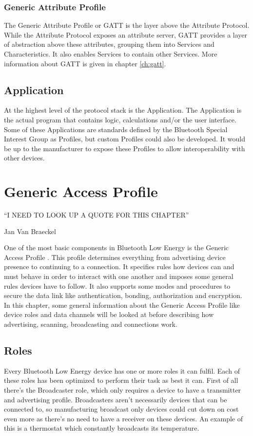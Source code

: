 \documentclass[pdftex,a4paper,12pt,twoside]{report}
\begin{document}
\subsection{Generic Attribute Profile}
\label{subsec:hostGATT}
The Generic Attribute Profile or GATT is the layer above the Attribute Protocol. While the Attribute Protocol exposes an attribute server, GATT provides a layer of abstraction above these attributes, grouping them into Services and Characteristics. It also enables Services to contain other Services. More information about GATT is given in chapter \ref{ch:gatt}.

\section{Application}
\label{sec:stackApplication}
At the highest level of the protocol stack is the Application. The Application is the actual program that contains logic, calculations and/or the user interface. Some of these Applications are standards defined by the Bluetooth Special Interest Group as Profiles, but custom Profiles could also be developed. It would be up to the manufacturer to expose these Profiles to allow interoperability with other devices.

\chapter{Generic Access Profile}
\label{ch:gap}
\epigraph{``I NEED TO LOOK UP A QUOTE FOR THIS CHAPTER''}{Jan Van Braeckel}
One of the most basic components in Bluetooth Low Energy is the Generic Access Profile \citep{heydon2012bluetooth}. This profile determines everything from advertising device presence to continuing to a connection. It specifies rules how devices can and must behave in order to interact with one another and imposes some general rules devices have to follow. It also supports some modes and procedures to secure the data link like authentication, bonding, authorization and encryption. In this chapter, some general information about the Generic Access Profile like device roles and data channels will be looked at before describing how advertising, scanning, broadcasting and connections work.

\newpage{}

\section{Roles}
\label{sec:roles}
Every Bluetooth Low Energy device has one or more roles it can fulfil. Each of these roles has been optimized to perform their task as best it can. First of all there's the Broadcaster role, which only requires a device to have a transmitter and advertising profile. Broadcasters aren't necessarily devices that can be connected to, so manufacturing broadcast only devices could cut down on cost even more as there's no need to have a receiver on these devices. An example of this is a thermostat which constantly broadcasts its temperature.
\end{document}

